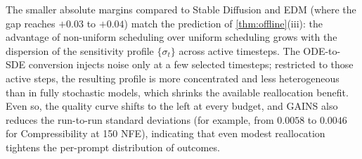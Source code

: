 The smaller absolute margins compared to Stable Diffusion and EDM (where the gap reaches $+0.03$ to $+0.04$) match the prediction of \cref{thm:offline}\textup{(iii)}: the advantage of non-uniform scheduling over uniform scheduling grows with the dispersion of the sensitivity profile $\{\sigma_t\}$ across active timesteps. The ODE-to-SDE conversion injects noise only at a few selected timesteps; restricted to those active steps, the resulting profile is more concentrated and less heterogeneous than in fully stochastic models, which shrinks the available reallocation benefit. Even so, the quality curve shifts to the left at every budget, and \textsc{GAINS} also reduces the run-to-run standard deviations (for example, from $0.0058$ to $0.0046$ for Compressibility at 150 NFE), indicating that even modest reallocation tightens the per-prompt distribution of outcomes.
